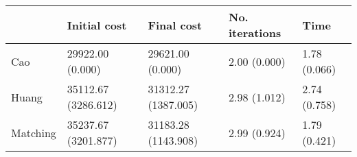 \begin{tabular}{lllll}
\toprule
{} &         Initial cost &           Final cost & No. iterations &          Time \\
\midrule
Cao      &     29922.00 (0.000) &     29621.00 (0.000) &   2.00 (0.000) &  1.78 (0.066) \\
Huang    &  35112.67 (3286.612) &  31312.27 (1387.005) &   2.98 (1.012) &  2.74 (0.758) \\
Matching &  35237.67 (3201.877) &  31183.28 (1143.908) &   2.99 (0.924) &  1.79 (0.421) \\
\bottomrule
\end{tabular}
